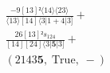 \documentclass[varwidth, border=5pt]{standalone}
\begin{document}
\begin{my}
$\begin{gathered}
\scriptscriptstyle\frac{-9[13]²⟨14⟩⟨23⟩}{⟨13⟩[14]⟨3|1+4|3]} +\\
\scriptscriptstyle\frac{26[13]²s_{124}}{[14][24]⟨3|𝟓|3]} +\\
\scriptscriptstyle(2143𝟓,\;\text{True},\;-) \phantom{+}
\end{gathered}$
\end{my}
\end{document}
